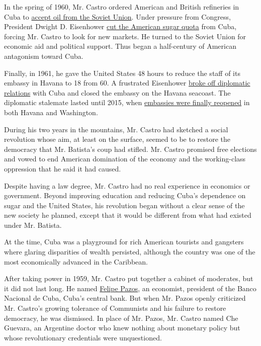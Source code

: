 In the spring of 1960, Mr. Castro ordered American and British
refineries in Cuba to
\href{http://query.nytimes.com/mem/archive-free/pdf?res=9402E5D9153DE333A25757C2A9639C946191D6CF}{accept
oil from the Soviet Union}. Under pressure from Congress, President
Dwight D. Eisenhower
\href{http://timesmachine.nytimes.com/timesmachine/1960/05/24/105436278.html?pageNumber=5\&rpm=true\&zoom=16}{cut
the American sugar quota} from Cuba, forcing Mr. Castro to look for new
markets. He turned to the Soviet Union for economic aid and political
support. Thus began a half-century of American antagonism toward Cuba.

Finally, in 1961, he gave the United States 48 hours to reduce the staff
of its embassy in Havana to 18 from 60. A frustrated Eisenhower
\href{http://query.nytimes.com/gst/abstract.html?res=9F02E2D81E31EE32A25757C0A9679C946091D6CF}{broke
off diplomatic relations} with Cuba and closed the embassy on the Havana
seacoast. The diplomatic stalemate lasted until 2015, when
\href{http://www.nytimes.com/2015/07/21/world/americas/cuba-us-embassy-diplomatic-relations.html}{embassies
were finally reopened} in both Havana and Washington.

During his two years in the mountains, Mr. Castro had sketched a social
revolution whose aim, at least on the surface, seemed to be to restore
the democracy that Mr. Batista's coup had stifled. Mr. Castro promised
free elections and vowed to end American domination of the economy and
the working-class oppression that he said it had caused.

Despite having a law degree, Mr. Castro had no real experience in
economics or government. Beyond improving education and reducing Cuba's
dependence on sugar and the United States, his revolution began without
a clear sense of the new society he planned, except that it would be
different from what had existed under Mr. Batista.

At the time, Cuba was a playground for rich American tourists and
gangsters where glaring disparities of wealth persisted, although the
country was one of the most economically advanced in the Caribbean.

After taking power in 1959, Mr. Castro put together a cabinet of
moderates, but it did not last long. He named
\href{http://www.nytimes.com/2001/03/09/world/felipe-pazos-88-economist-cuban-split-early-with-castro.html}{Felipe
Pazos}, an economist, president of the Banco Nacional de Cuba, Cuba's
central bank. But when Mr. Pazos openly criticized Mr. Castro's growing
tolerance of Communists and his failure to restore democracy, he was
dismissed. In place of Mr. Pazos, Mr. Castro named Che Guevara, an
Argentine doctor who knew nothing about monetary policy but whose
revolutionary credentials were unquestioned.

